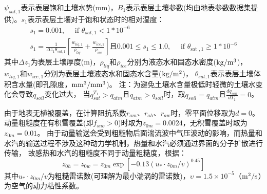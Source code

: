 $\psi_{sat,1}$表示表层饱和土壤水势(mm)，$B_1$表示表层土壤\citet{clapp1978empirical}参数(均由地表参数数据集提供)。$s_1$表示表层土壤对于饱和状态时的相对湿度：
\begin{equation}
\begin{array}{c}s_{1}=0.001, \quad \text { if } \theta_{{sat }, 1}<1 * 10^{-6} \\ 
     s_{1}=\frac{1}{\Delta z_{1} \theta_{{sat }, 1}}\left[\frac{w_{l i q, 1}}{\rho_{l i q}}+\frac{w_{i c e, 1}}{\rho_{{ice }}}\right]  \text{且}  0.001 \leq s_{1} \leq 1.0, \quad \text { if } \theta_{\text {sat }, 1} \geq 1 * 10^{-6}\end{array}
\end{equation}
其中$\Delta z_{1}$为表层土壤厚度(m)，$\rho_{liq}$和$\rho_{ice}$分别为液态水和固态水密度($\rm kg/m^3$)，
$w_{liq,1}$和$w_{ice,1}$分别为表层土壤液态水和固态水含量($\rm kg/m^2$)，
$\theta_{sat,1}$表示表层土壤体积含水量(即孔隙度，$\rm mm^3/mm^3$)。
注：为避免土壤水含量极低时轻微的土壤水变化会导致$q_{soil}$变化过大，
当$q_{sat}^{T_1}>q_{atm}$且$q_{atm}>q_{soil}$时，取$q_{soil}=q_{atm}$且$\frac{dq_{soil}}{dT_1}=0$。


由于地表无植被覆盖，在计算阻抗系数$r_{am}$、$r_{ah}$、$r_{aw}$时，零平面位移取为$d=0$。
动量粗糙度在有积雪覆盖(即$f_{sno}>0$)时取为$z_{0m}=0.0024$，无积雪覆盖时取为$z_{0m}=0.01$。
由于动量输送会受到粗糙物后面湍流波中气压波动的影响，而热量和水汽的输送过程不涉及这种动力学机制，热量和水汽必须通过界面的分子扩散进行传输，
故感热和水汽的粗糙度不同于动量粗糙度，根据\citep{zeng1998effect}：
\begin{equation}\label{z0hw}
z_{0 h}=z_{0 w}=z_{0 m} \exp \left[-0.13\left(u_{*} \cdot z_{0 m} / v\right)^{0.45}\right]
\end{equation}
其中$u_{*} \cdot z_{0 m} / v$为粗糙雷诺数(可理解为最小湍涡的雷诺数)，$\upsilon=1.5\times{10}^{-5}$（$\rm m^2/s$）为空气的动力粘性系数。


